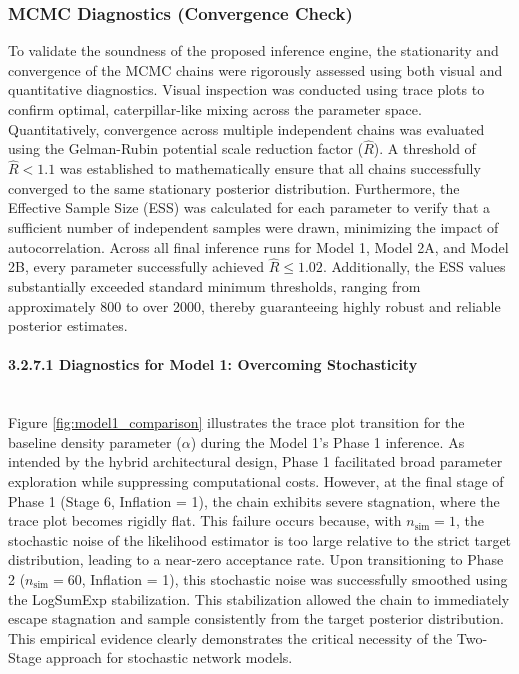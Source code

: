\subsubsection{MCMC Diagnostics (Convergence Check)}
To validate the soundness of the proposed inference engine, the stationarity and convergence of the MCMC chains were rigorously assessed using both visual and quantitative diagnostics.
Visual inspection was conducted using trace plots to confirm optimal, caterpillar-like mixing across the parameter space.
Quantitatively, convergence across multiple independent chains was evaluated using the Gelman-Rubin potential scale reduction factor ($\hat{R}$).
A threshold of $\hat{R} < 1.1$ was established to mathematically ensure that all chains successfully converged to the same stationary posterior distribution.
Furthermore, the Effective Sample Size (ESS) was calculated for each parameter to verify that a sufficient number of independent samples were drawn, minimizing the impact of autocorrelation.
Across all final inference runs for Model 1, Model 2A, and Model 2B, every parameter successfully achieved $\hat{R} \le 1.02$.
Additionally, the ESS values substantially exceeded standard minimum thresholds, ranging from approximately 800 to over 2000, thereby guaranteeing highly robust and reliable posterior estimates.

\paragraph{3.2.7.1 Diagnostics for Model 1: Overcoming Stochasticity}\mbox{}\\
Figure \ref{fig:model1_comparison} illustrates the trace plot transition for the baseline density parameter ($\alpha$) during the Model 1's Phase 1 inference.
As intended by the hybrid architectural design, Phase 1 facilitated broad parameter exploration while suppressing computational costs.
However, at the final stage of Phase 1 (Stage 6, Inflation = 1), the chain exhibits severe stagnation, where the trace plot becomes rigidly flat.
This failure occurs because, with $n_{\text{sim}}=1$, the stochastic noise of the likelihood estimator is too large relative to the strict target distribution, leading to a near-zero acceptance rate.
Upon transitioning to Phase 2 ($n_{\text{sim}}=60$, Inflation = 1), this stochastic noise was successfully smoothed using the LogSumExp stabilization.
This stabilization allowed the chain to immediately escape stagnation and sample consistently from the target posterior distribution.
This empirical evidence clearly demonstrates the critical necessity of the Two-Stage approach for stochastic network models.

